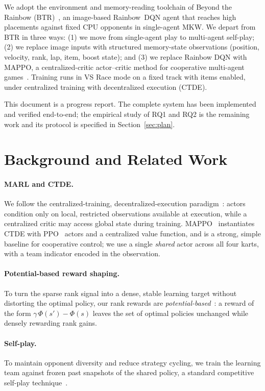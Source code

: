 \documentclass{article}
\begin{document}
We adopt the environment and memory-reading toolchain of Beyond the Rainbow
(BTR)~\citep{btr}, an image-based Rainbow~DQN agent that reaches high placements
against fixed CPU opponents in single-agent MKW. We depart from BTR in three
ways: (1) we move from single-agent play to multi-agent self-play; (2) we replace
image inputs with structured memory-state observations (position, velocity,
rank, lap, item, boost state); and (3) we replace Rainbow DQN with MAPPO, a
centralized-critic actor--critic method for cooperative multi-agent
games~\citep{mappo}. Training runs in VS Race mode on a fixed track with items
enabled, under centralized training with decentralized execution (CTDE).

This document is a progress report. The complete system has been implemented and
verified end-to-end; the empirical study of RQ1 and RQ2 is the remaining work
and its protocol is specified in Section~\ref{sec:plan}.


\section{Background and Related Work}

\paragraph{MARL and CTDE.} We follow the centralized-training,
decentralized-execution paradigm~\citep{maddpg}: actors condition only on local,
restricted observations available at execution, while a centralized critic may
access global state during training. MAPPO~\citep{mappo} instantiates CTDE with
PPO~\citep{ppo} actors and a centralized value function, and is a strong,
simple baseline for cooperative control; we use a single \emph{shared} actor
across all four karts, with a team indicator encoded in the observation.

\paragraph{Potential-based reward shaping.} To turn the sparse rank signal into a
dense, stable learning target without distorting the optimal policy, our rank
rewards are \emph{potential-based}~\citep{shaping}: a reward of the form
$\gamma\,\Phi(s')-\Phi(s)$ leaves the set of optimal policies unchanged while
densely rewarding rank gains.

\paragraph{Self-play.} To maintain opponent diversity and reduce strategy
cycling, we train the learning team against frozen past snapshots of the shared
policy, a standard competitive self-play technique~\citep{selfplay}.
\end{document}
